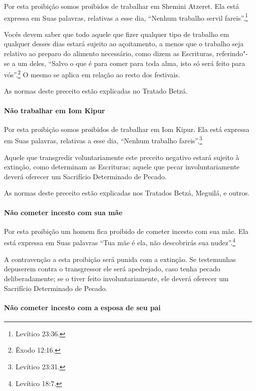 \begin{multicols}{2}
Por esta proibição somos proibidos de trabalhar em Shemini Atzeret\starr.
Ela está expressa em Suas palavras, relativas a esse dia, ``Nenhum
trabalho servil fareis''.\footnote{Levítico 23:36.}

Vocês devem saber que todo aquele que fizer qualquer tipo de trabalho em
qualquer desses dias estará sujeito ao açoitamento, a menos que o
trabalho seja relativo ao preparo do alimento necessário, como dizem as
Escrituras, referindo"-se a um deles, ``Salvo o que é
para comer para toda alma, isto só será feito para vós''.\footnote{Êxodo 12:16.}
O mesmo se aplica em relação ao resto dos festivais.

As normas deste preceito estão explicadas no Tratado Betzá\starr.

\paragraph{Não trabalhar em Iom Kipur\starr}

Por esta proibição somos proibidos de trabalhar em Iom Kipur\starr. Ela
está expressa em Suas palavras, relativas a esse dia, ``Nenhum trabalho
fareis''.\footnote{Levítico 23:31.}

Aquele que transgredir voluntariamente este preceito negativo estará
sujeito à extinção, como determinam as Escrituras; aquele que pecar
involuntariamente deverá oferecer um Sacrifício Determinado de Pecado.

As normas deste preceito estão explicadas nos Tratados Betzá\starr, Meguilá\starr, e
outros.

\paragraph{Não cometer incesto com sua mãe}

Por esta proibição um homem fica proibido de cometer incesto com sua
mãe. Ela está expressa em Suas palavras ``Tua mãe é ela, não descobrirás
sua nudez''.\footnote{Levítico 18:7.}

A contravenção a esta proibição será punida com a extinção. Se
testemunhas depuserem contra o transgressor ele será apedrejado, caso
tenha pecado deliberadamente; se o tiver feito involuntariamente, ele
deverá oferecer um Sacrifício Determinado de Pecado.

\paragraph{Não cometer incesto com a esposa de seu pai}


\end{multicols}
